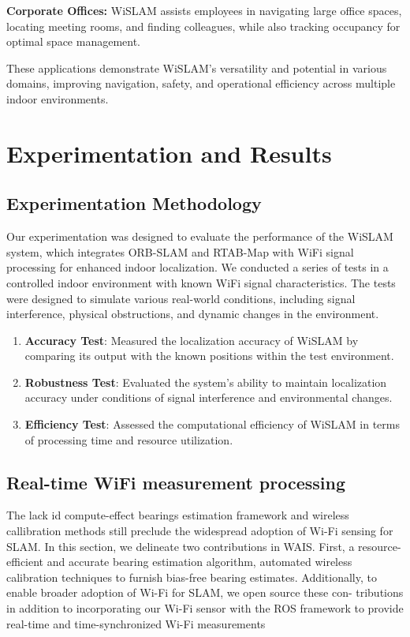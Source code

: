 \documentclass[
	a4paper, %
	11pt, %
	unnumberedsections, %
	twoside, %
]{LTJournalArticle}
\begin{document}
\textbf{Corporate Offices:} WiSLAM assists employees in navigating large office spaces, locating meeting rooms, and finding colleagues, while also tracking occupancy for optimal space management.

These applications demonstrate WiSLAM's versatility and potential in various domains, improving navigation, safety, and operational efficiency across multiple indoor environments.

\section{Experimentation and Results}

\subsection{Experimentation Methodology}
Our experimentation was designed to evaluate the performance of the WiSLAM system, which integrates ORB-SLAM and RTAB-Map with WiFi signal processing for enhanced indoor localization. We conducted a series of tests in a controlled indoor environment with known WiFi signal characteristics. The tests were designed to simulate various real-world conditions, including signal interference, physical obstructions, and dynamic changes in the environment.


\begin{enumerate}
	\item \textbf{Accuracy Test}: Measured the localization accuracy of WiSLAM by comparing its output with the known positions within the test environment.
	\item \textbf{Robustness Test}: Evaluated the system's ability to maintain localization accuracy under conditions of signal interference and environmental changes.
	\item \textbf{Efficiency Test}: Assessed the computational efficiency of WiSLAM in terms of processing time and resource utilization.
\end{enumerate}

\subsection{Real-time WiFi measurement processing}
The lack id compute-effect bearings estimation framework and wireless callibration methods still preclude the widespread adoption of Wi-Fi sensing for SLAM. In this section, we delineate two contributions in WAIS. First, a resource-efficient and accurate bearing estimation algorithm, automated wireless calibration techniques to furnish bias-free bearing estimates. Additionally, to enable broader adoption of Wi-Fi for SLAM, we open source these con- tributions in addition to incorporating our Wi-Fi sensor with the ROS framework to provide real-time and time-synchronized Wi-Fi measurements
\end{document}
